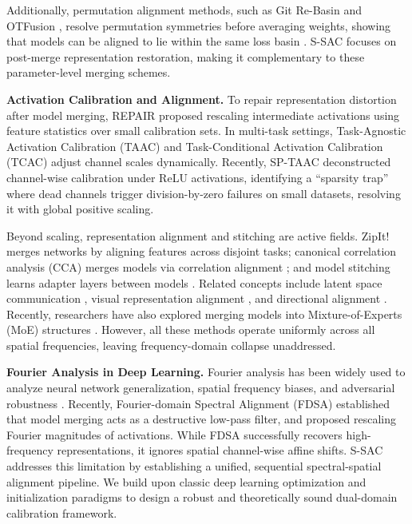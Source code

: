 \documentclass{article}
\theoremstyle{plain}
\theoremstyle{definition}
\theoremstyle{remark}
\begin{document}
Additionally, permutation alignment methods, such as Git Re-Basin \cite{ainsworth2023git} and OTFusion \cite{singh2020model}, resolve permutation symmetries before averaging weights, showing that models can be aligned to lie within the same loss basin \cite{frankle2020linear}. S-SAC focuses on post-merge representation restoration, making it complementary to these parameter-level merging schemes.

\textbf{Activation Calibration and Alignment.}
To repair representation distortion after model merging, REPAIR \cite{jordan2022repair} proposed rescaling intermediate activations using feature statistics over small calibration sets. In multi-task settings, Task-Agnostic Activation Calibration (TAAC) \cite{srac2026} and Task-Conditional Activation Calibration (TCAC) adjust channel scales dynamically. Recently, SP-TAAC \cite{sptaac2026} deconstructed channel-wise calibration under ReLU activations, identifying a ``sparsity trap'' where dead channels trigger division-by-zero failures on small datasets, resolving it with global positive scaling. 

Beyond scaling, representation alignment and stitching are active fields. ZipIt! \cite{stoica2024zipit} merges networks by aligning features across disjoint tasks; canonical correlation analysis (CCA) merges models via correlation alignment \cite{ortiz2024harmony}; and model stitching learns adapter layers between models \cite{bansal2021revisiting}. Related concepts include latent space communication \cite{moschella2023relative}, visual representation alignment \cite{yoon2025visual, yoshida2025mastering}, and directional alignment \cite{mda2025directional}. Recently, researchers have also explored merging models into Mixture-of-Experts (MoE) structures \cite{zhou-etal-2025-mergeme, tang2024merging, mc-smoe2023, bertolissi2025local}. However, all these methods operate uniformly across all spatial frequencies, leaving frequency-domain collapse unaddressed.

\textbf{Fourier Analysis in Deep Learning.}
Fourier analysis has been widely used to analyze neural network generalization, spatial frequency biases, and adversarial robustness \cite{hendrycks2019benchmarking}. Recently, Fourier-domain Spectral Alignment (FDSA) \cite{fdsa2026} established that model merging acts as a destructive low-pass filter, and proposed rescaling Fourier magnitudes of activations. While FDSA successfully recovers high-frequency representations, it ignores spatial channel-wise affine shifts. S-SAC addresses this limitation by establishing a unified, sequential spectral-spatial alignment pipeline. We build upon classic deep learning optimization and initialization paradigms \cite{ioffe2015batch, kingma2014adam, srivastava2014dropout, glorot2010understanding, he2015delving} to design a robust and theoretically sound dual-domain calibration framework.
\end{document}
